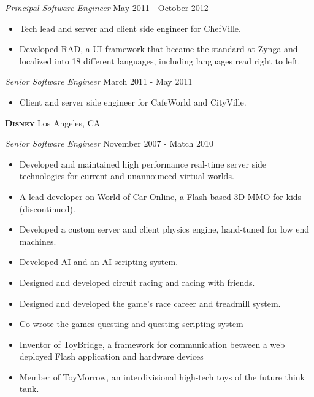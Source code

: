 \documentclass[a4paper]{article}
\begin{document}
\begin{addmargin}[1em]{0em}

\textit{Principal Software Engineer} \hfill May 2011 - October 2012\\
\vspace{-1mm}
\begin{itemize} \itemsep 1pt
    \item Tech lead and server and client side engineer for ChefVille.
    \item Developed RAD, a UI framework that became the standard at Zynga and localized
    into 18 different languages, including languages read right to left.
\end{itemize}
\textit{Senior Software Engineer} \hfill March 2011 - May 2011\\
\vspace{-1mm}
\begin{itemize} \itemsep 1pt
    \item Client and server side engineer for CafeWorld and CityVille.
\end{itemize}
\end{addmargin}

\textbf{\textsc{Disney}} \hfill Los Angeles, CA\\
\vspace{2mm}

\begin{addmargin}[1em]{0em}

\textit{Senior Software Engineer} \hfill November 2007 - Match 2010\\
\vspace{-1mm}
\begin{itemize} \itemsep 1pt
    \item Developed and maintained high performance real-time server side
        technologies for current and unannounced virtual worlds.
    \item A lead developer on World of Car Online, a Flash based 3D MMO for kids 
        (discontinued).
    \item Developed a custom server and client physics engine, hand-tuned for low 
        end machines.
    \item Developed AI and an AI scripting system.
    \item Designed and developed circuit racing and racing with friends.
    \item Designed and developed the game's race career and treadmill system.
    \item Co-wrote the games questing and questing scripting system
    \item Inventor of ToyBridge, a framework for communication between a web 
        deployed Flash application and hardware devices
    \item Member of ToyMorrow, an interdivisional high-tech toys of the future think 
        tank.
\end{itemize}

\end{addmargin}
\end{document}
